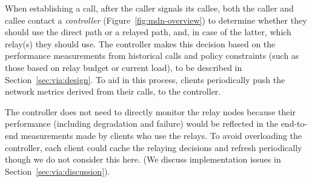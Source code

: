 When establishing a call, after the caller signals its callee, both the caller and callee contact a {\em controller} (Figure~\ref{fig:mdn-overview}) to determine whether they should use the direct path or a relayed path, and, in case of the latter, which relay(s) they should use. The controller makes this decision based on the performance measurements from historical calls and policy constraints (such as those based on relay budget or current load), to be described in Section~\ref{sec:via:design}. To aid in this process, \skype clients periodically push the network metrics derived from their calls, to the controller. 

The controller does not need to directly monitor the relay nodes because their performance (including degradation and failure) would be reflected in the end-to-end measurements made by clients who use the relays. %
To avoid overloading the controller, each client could cache the relaying decisions and refresh periodically though we do not consider this here. (We 
 discuss implementation issues in Section~\ref{sec:via:discussion}). %
